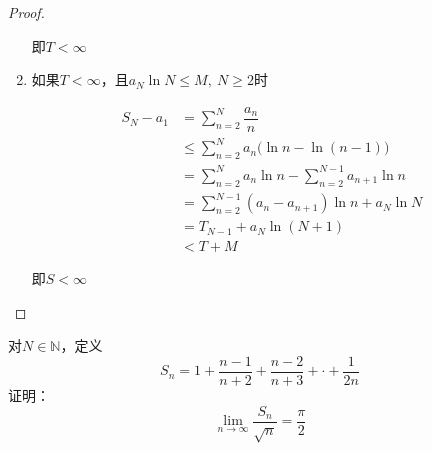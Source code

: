 \begin{proof}
\begin{enumerate}
                即$T < \infty$

        \item 
                如果$T < \infty$，且$a_{N}\ln{N} \leq M,\ N \geq 2$时
                        
                \begin{align*}
                    S_N - a_1 &= \sum_{n=2}^{N}{\dfrac{a_n}{n}} \\
                    & \leq \sum_{n=2}^{N}{a_n\big(\ln{n} - \ln(n-1)\big)} \\
                    & = \sum_{n=2}^{N}{a_n\ln{n}} - \sum_{n=2}^{N-1}{a_{n+1}\ln{n}} \\
                    & = \sum_{n=2}^{N-1}{(a_n - a_{n+1})\ln{n}} + a_N\ln{N} \\
                    & = T_{N-1} + a_N\ln{(N+1)} \\ 
                    & < T + M
                \end{align*}

                即$S < \infty$

     \end{enumerate}

\end{proof}

\begin{proposition}
    
    对$N \in \mathbb{N}$，定义
    $$ S_n = 1 + \dfrac{n-1}{n+2} +\dfrac{n-2}{n+3} + \cdot + \dfrac{1}{2n} $$
    证明：
    $$\lim_{n\to\infty}{\dfrac{S_n}{\sqrt{n}}} = \dfrac{\pi}{2}$$

\end{proposition}

